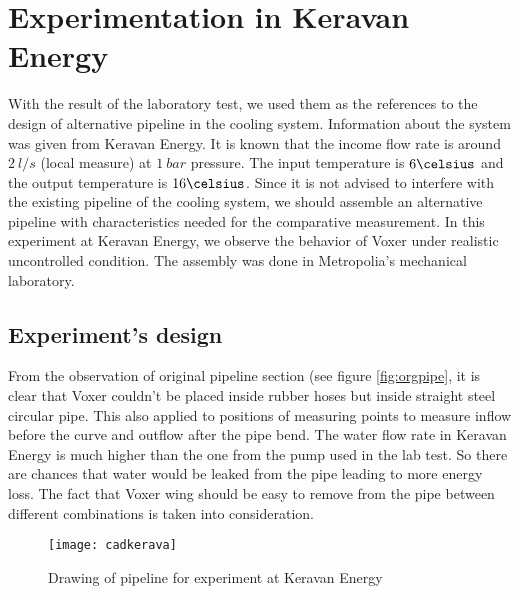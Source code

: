 \section{Experimentation in Keravan Energy}

With the result of the laboratory test, we used them as the references to the design of alternative pipeline in the cooling system. Information about the system was given from Keravan Energy. It is known that the income flow rate is around $2\ l/s$ (local measure) at $1\ bar$ pressure. The input temperature is $6\celsius$  and the output temperature is $16\celsius$. 
Since it is not advised to interfere with the existing pipeline of the cooling system, we should assemble an alternative pipeline with characteristics needed for the comparative measurement. In this experiment at Keravan Energy, we observe the behavior of Voxer under realistic uncontrolled condition. The assembly was done in Metropolia's mechanical laboratory.  

\subsection{Experiment's design}

From the observation of original pipeline section (see figure \vref{fig:orgpipe}, it is clear that Voxer couldn't be placed inside rubber hoses but inside straight steel circular pipe. This also applied to positions of measuring points to measure inflow before the curve and outflow after the pipe bend. The water flow rate in Keravan Energy is much higher than the one from the pump used in the lab test. So there are chances that water would be leaked from the pipe leading to more energy loss. The fact that Voxer wing should be easy to remove from the pipe between different combinations  is taken into consideration.

\begin{figure}[h]
  \centering
  \texttt{[image: cadkerava]}
  \caption{ Drawing of pipeline for experiment at Keravan Energy}
  \label{fig:cadkerava}
\end{figure}

